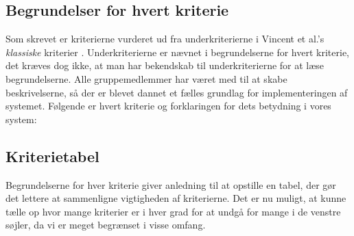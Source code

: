 \subsection{Begrundelser for hvert kriterie}
Som skrevet er kriterierne vurderet ud fra underkriterierne i Vincent et al.'s \emph{klassiske} kriterier \cite[s.~12]{crit}. Underkriterierne er nævnet i begrundelserne for hvert kriterie, det kræves dog ikke, at man har bekendskab til underkriterierne for at læse begrundelserne. Alle gruppemedlemmer har været med til at skabe beskrivelserne, så der er blevet dannet et fælles grundlag for implementeringen af systemet. Følgende er hvert kriterie og forklaringen for dets betydning i vores system:



\subsection{Kriterietabel}
Begrundelserne for hver kriterie giver anledning til at opstille en tabel, der gør det lettere at sammenligne vigtigheden af kriterierne. Det er nu muligt, at kunne tælle op hvor mange kriterier er i hver grad for at undgå for mange i de venstre søjler, da vi er meget begrænset i visse omfang.



